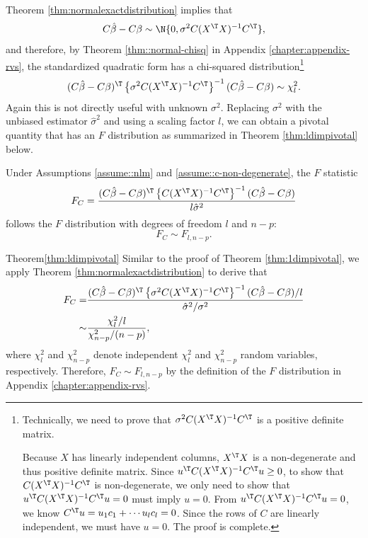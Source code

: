 Theorem \ref{thm:normalexactdistribution} implies that 
\[
C\hat{\beta}-C\beta\sim\N\{ 0,\sigma^{2}C(X^{\T}X)^{-1}C^{\T}\} ,
\]
and therefore, by Theorem \ref{thm::normal-chisq} in Appendix \ref{chapter:appendix-rvs},  the standardized quadratic form has a chi-squared distribution\footnote{
Technically, we need to prove that $\sigma^{2}C(X^{\T}X)^{-1}C^{\T}$ is a positive definite matrix.

Because $X$ has linearly independent columns, $X^{\T}X$ is a non-degenerate and thus positive definite
matrix. Since $ u^{\T} C(X^{\T}X)^{-1}C^{\T}u \geq 0$, to show that $C(X^{\T}X)^{-1}C^{\T}$ is non-degenerate, we only need to show that $u^{\T} C(X^{\T}X)^{-1}C^{\T}u  = 0$ must imply  $u = 0$. 
From $u^{\T} C(X^{\T}X)^{-1}C^{\T}u  = 0$, we know  $C^{\T}u = u_1 c_1 + \cdots u_l c_l = 0$. Since the rows of $C$ are linearly independent, we must have $u = 0$. The proof is complete.}
\[
(C\hat{\beta}-C\beta)^{\T}\left\{ \sigma^{2}C(X^{\T}X)^{-1}C^{\T}\right\} ^{-1}(C\hat{\beta}-C\beta)\sim\chi_{l}^{2}.
\]
Again this is not directly useful with unknown $\sigma^{2}.$ Replacing
$\sigma^{2}$ with the unbiased estimator $\hat{\sigma}^{2}$ and
using a scaling factor $l$, we can obtain a pivotal quantity that
has an $F$ distribution as summarized in  Theorem \ref{thm:ldimpivotal} below.

\begin{theorem}
\label{thm:ldimpivotal}Under Assumptions \ref{assume::nlm} and \ref{assume::c-non-degenerate}, the $F$ statistic
\[
F_C  = 
\frac{(C\hat{\beta}-C\beta)^{\T}\left\{ C(X^{\T}X)^{-1}C^{\T}\right\} ^{-1}(C\hat{\beta}-C\beta)}{l\hat{\sigma}^{2}}
\]
follows the $F$ distribution with degrees of freedom $l$ and $n-p$:
$$
F_C  \sim F_{l,n-p} . 
$$
\end{theorem}


\begin{myproof}{Theorem}{\ref{thm:ldimpivotal}}
Similar to the proof of Theorem \ref{thm:1dimpivotal}, we apply Theorem
\ref{thm:normalexactdistribution} to derive that
\[
\begin{aligned} 
F_C
= & \frac{(C\hat{\beta}-C\beta)^{\T}\left\{ \sigma^{2}C(X^{\T}X)^{-1}C^{\T}\right\} ^{-1}(C\hat{\beta}-C\beta)/l}{\hat{\sigma}^{2}/\sigma^{2}}\\
\sim & \frac{\chi_{l}^{2}/l}{\chi_{n-p}^{2}/(n-p)} ,
\end{aligned}
\]
where $\chi_{l}^{2} $ and $\chi_{n-p}^{2} $ denote independent $\chi_{l}^{2} $ and $\chi_{n-p}^{2} $ random variables, respectively. Therefore, $F_C  \sim  F_{l,n-p}$ by the definition of the $F$ distribution in Appendix \ref{chapter:appendix-rvs}. 
\end{myproof}




